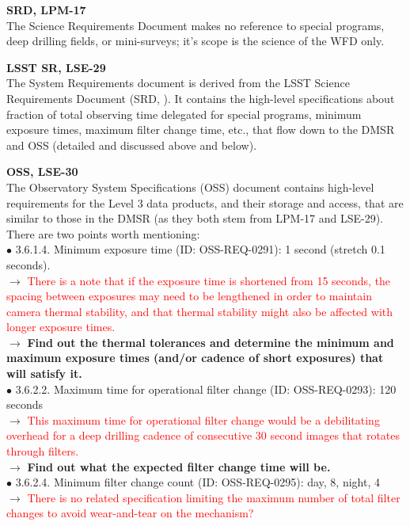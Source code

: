 \documentclass[DM,lsstdraft,toc]{lsstdoc}
\begin{document}
\noindent \textbf{SRD, LPM-17}\\
The Science Requirements Document \citep{LPM-17} makes no reference to special programs, deep drilling fields, or mini-surveys; it's scope is the science of the WFD only.

\noindent \textbf{LSST SR, LSE-29}\\
The System Requirements document \citep{LSE-29} is derived from the LSST Science Requirements Document (SRD, \citep{LPM-17}). It contains the high-level specifications about fraction of total observing time delegated for special programs, minimum exposure times, maximum filter change time, etc., that flow down to the DMSR and OSS (detailed and discussed above and below).

\noindent \textbf{OSS, LSE-30}\\
The Observatory System Specifications (OSS) document \citep{LSE-30} contains high-level requirements for the Level 3 data products, and their storage and access, that are similar to those in the DMSR (as they both stem from LPM-17 and LSE-29). There are two points worth mentioning: \\
$\bullet$ 3.6.1.4. Minimum exposure time (ID: OSS-REQ-0291): 1 second (stretch 0.1 seconds). \\
$\rightarrow$ \textcolor{red}{There is a note that if the exposure time is shortened from 15 seconds, the spacing between exposures may need to be lengthened in order to maintain camera thermal stability, and that thermal stability might also be affected with longer exposure times.}\\
$\rightarrow$ \textbf{Find out the thermal tolerances and determine the minimum and maximum exposure times (and/or cadence of short exposures) that will satisfy it.} \\
$\bullet$ 3.6.2.2. Maximum time for operational filter change (ID: OSS-REQ-0293): 120 seconds \\
$\rightarrow$ \textcolor{red}{This maximum time for operational filter change would be a debilitating overhead for a deep drilling cadence of consecutive 30 second images that rotates through filters.}\\
$\rightarrow$ \textbf{Find out what the expected filter change time will be.} \\
$\bullet$ 3.6.2.4. Minimum filter change count (ID: OSS-REQ-0295): day, 8, night, 4 \\
$\rightarrow$ \textcolor{red}{There is no related specification limiting the maximum number of total filter changes to avoid wear-and-tear on the mechanism?} 
\end{document}
